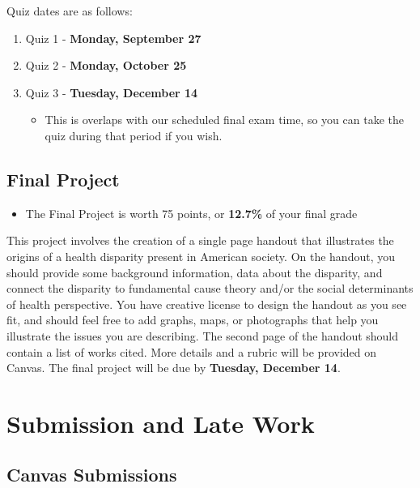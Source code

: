 \documentclass[
]{book}
\providecommand{\tightlist}{%
  \setlength{\itemsep}{0pt}\setlength{\parskip}{0pt}}
\newenvironment{rmdblock}[1]
  {\begin{shaded*}
  \begin{itemize}
  \renewcommand{\labelitemi}{
    \raisebox{-.7\height}[0pt][0pt]{
      {\setkeys{Gin}{width=3em,keepaspectratio}\texttt{[image: images/\#1]}}
    }
  }
  \item
  }
  {
  \end{itemize}
  \end{shaded*}
  }
\newenvironment{rmdtip}
  {\begin{rmdblock}{tip}}
  {\end{rmdblock}}
\begin{document}
Quiz dates are as follows:

\begin{enumerate}
\def\labelenumi{\arabic{enumi}.}
\tightlist
\item
  Quiz 1 - \textbf{Monday, September 27}
\item
  Quiz 2 - \textbf{Monday, October 25}
\item
  Quiz 3 - \textbf{Tuesday, December 14}

  \begin{itemize}
  \tightlist
  \item
    This is overlaps with our scheduled final exam time, so you can take the quiz during that period if you wish.
  \end{itemize}
\end{enumerate}

\hypertarget{final-project}{%
\subsection{Final Project}\label{final-project}}

\begin{rmdtip}
The Final Project is worth 75 points, or \textbf{12.7\%} of your final
grade
\end{rmdtip}

This project involves the creation of a single page handout that illustrates the origins of a health disparity present in American society. On the handout, you should provide some background information, data about the disparity, and connect the disparity to fundamental cause theory and/or the social determinants of health perspective. You have creative license to design the handout as you see fit, and should feel free to add graphs, maps, or photographs that help you illustrate the issues you are describing. The second page of the handout should contain a list of works cited. More details and a rubric will be provided on Canvas. The final project will be due by \textbf{Tuesday, December 14}.

\hypertarget{submission-and-late-work}{%
\section{Submission and Late Work}\label{submission-and-late-work}}

\hypertarget{canvas-submissions}{%
\subsection{Canvas Submissions}\label{canvas-submissions}}
\end{document}
